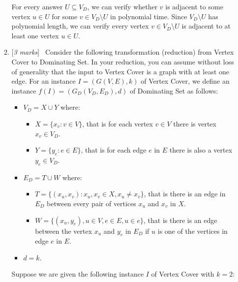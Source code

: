 \documentclass[11pt]{article}
\newcommand{\Q}[1]{\medskip\item {[{\em #1 marks\/}]}\ }
\begin{document}
\begin{enumerate}
\begin{enumerate}
For every answer $U \subseteq V_D$, we can verify whether $v$ is adjacent to some vertex $u \in U$ for some 
$v \in V_D \setminus U$ in polynomial time. Since $ V_D \setminus U$ has polynomial length, we can verify 
every vertex $v \in V_D \setminus U$ is adjacent to at least one vertex $u \in U$.

\newpage
\Q{3}  Consider the following transformation (reduction) from {\sc Vertex Cover} to {\sc Dominating Set}. In your reduction, you can assume without loss of generality that the input to {\sc Vertex Cover} is a graph with at least one edge. For an instance $I = (G(V, E), k)$ of {\sc Vertex Cover}, we define an instance 
$f(I) = (G_D(V_D, E_D), d)$ of {\sc Dominating Set} as follows:
\begin{itemize}
\item $V_D = X \cup Y$ where:
\begin{itemize}
\item[] $X = \{x_v : v \in V\}$, that is for each vertex $v \in V$ there is vertex $x_v \in V_D$.
\item[] $Y = \{y_e : e \in E\}$,  that is for each edge $e$ in $E$ there is also a vertex $y_e \in V_D$.
\end{itemize}

\item $E_D = T \cup W$ where:
	\begin{itemize}
		\item[] $T = \{ (x_u, x_v): x_u,x_v \in X, x_u \neq x_v\}$, that is there is an edge in $E_D$ between every pair of vertices $x_u$ and $x_v$ in $X$.

		\item[] $W = \{(x_u, y_e), u \in V, e \in E, u \in e\}$, that is there is an edge between the vertex $x_u$ and $y_e$ in $E_D$ if $u$ is one of the vertices in edge $e$ in $E$.
	\end{itemize}

\item $d = k$.
\end{itemize}

Suppose we are given the following instance $I$ of {\sc Vertex Cover} with $k=2$:
\begin{center}
\end{center}
\end{enumerate}
\end{enumerate}
\end{document}
